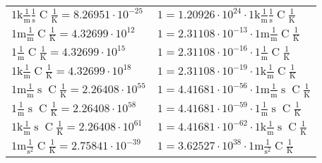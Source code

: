 \begin{center}
\begin{longtable}{l l}
{\color{gray}$1 \bm{\mathrm{ k}}\frac1{\operatorname{m}}\frac1{\operatorname{s}}{\operatorname{C}}\frac1{\operatorname{K}} = 8.26951\cdot10^{-25} $}   & {\color{gray}$ 1 = 1.20926\cdot10^{24} \cdot 1 \bm{\mathrm{ k}}\frac1{\operatorname{m}}\frac1{\operatorname{s}}{\operatorname{C}}\frac1{\operatorname{K}}$}  \\
{\color{gray}$1 \bm{\mathrm{ m}}\frac1{\operatorname{m}}{}{\operatorname{C}}\frac1{\operatorname{K}} = 4.32699\cdot10^{12} $}   & {\color{gray}$ 1 = 2.31108\cdot10^{-13} \cdot 1 \bm{\mathrm{ m}}\frac1{\operatorname{m}}{}{\operatorname{C}}\frac1{\operatorname{K}}$}  \\
{\color{black}$1 \bm{\mathrm{ }}\frac1{\operatorname{m}}{}{\operatorname{C}}\frac1{\operatorname{K}} = 4.32699\cdot10^{15} $}   & {\color{black}$ 1 = 2.31108\cdot10^{-16} \cdot 1 \bm{\mathrm{ }}\frac1{\operatorname{m}}{}{\operatorname{C}}\frac1{\operatorname{K}}$}  \\
{\color{gray}$1 \bm{\mathrm{ k}}\frac1{\operatorname{m}}{}{\operatorname{C}}\frac1{\operatorname{K}} = 4.32699\cdot10^{18} $}   & {\color{gray}$ 1 = 2.31108\cdot10^{-19} \cdot 1 \bm{\mathrm{ k}}\frac1{\operatorname{m}}{}{\operatorname{C}}\frac1{\operatorname{K}}$}  \\
{\color{gray}$1 \bm{\mathrm{ m}}\frac1{\operatorname{m}}{\operatorname{s}}{\operatorname{C}}\frac1{\operatorname{K}} = 2.26408\cdot10^{55} $}   & {\color{gray}$ 1 = 4.41681\cdot10^{-56} \cdot 1 \bm{\mathrm{ m}}\frac1{\operatorname{m}}{\operatorname{s}}{\operatorname{C}}\frac1{\operatorname{K}}$}  \\
{\color{black}$1 \bm{\mathrm{ }}\frac1{\operatorname{m}}{\operatorname{s}}{\operatorname{C}}\frac1{\operatorname{K}} = 2.26408\cdot10^{58} $}   & {\color{black}$ 1 = 4.41681\cdot10^{-59} \cdot 1 \bm{\mathrm{ }}\frac1{\operatorname{m}}{\operatorname{s}}{\operatorname{C}}\frac1{\operatorname{K}}$}  \\
{\color{gray}$1 \bm{\mathrm{ k}}\frac1{\operatorname{m}}{\operatorname{s}}{\operatorname{C}}\frac1{\operatorname{K}} = 2.26408\cdot10^{61} $}   & {\color{gray}$ 1 = 4.41681\cdot10^{-62} \cdot 1 \bm{\mathrm{ k}}\frac1{\operatorname{m}}{\operatorname{s}}{\operatorname{C}}\frac1{\operatorname{K}}$}  \\
{\color{gray}$1 \bm{\mathrm{ m}}{}\frac1{\operatorname{s}^2}{\operatorname{C}}\frac1{\operatorname{K}} = 2.75841\cdot10^{-39} $}   & {\color{gray}$ 1 = 3.62527\cdot10^{38} \cdot 1 \bm{\mathrm{ m}}{}\frac1{\operatorname{s}^2}{\operatorname{C}}\frac1{\operatorname{K}}$}  \\

\end{longtable}
\end{center}
